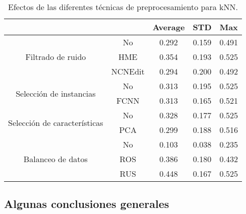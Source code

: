 \begin{table}
    \centering
    \begin{tabular}{cc|c|c|c|}
    \cline{3-5}
    \multicolumn{1}{l}{\textbf{}} & \textbf{} & \multicolumn{1}{c|}{\textbf{Average}} & \multicolumn{1}{c|}{\textbf{STD}} & \textbf{Max} \\ \hline
    \multicolumn{1}{|c|}{\multirow{3}{*}{Filtrado de ruido}}       & No        & 0.292  & 0.159
    & 0.491    \\ \cline{2-5} 
    \multicolumn{1}{|c|}{}  & HME       & 0.354   & 0.193
    & 0.525        \\ \cline{2-5} 
    \multicolumn{1}{|c|}{}  & NCNEdit   & 0.294  & 0.200
    & 0.492        \\ \hline
    \multicolumn{1}{|c|}{\multirow{2}{*}{Selección de instancias}} & No        & 0.313    &  0.195
    & 0.525        \\ \cline{2-5} 
    \multicolumn{1}{|c|}{}  & FCNN      & 0.313   &  0.165
    & 0.521        \\ \hline
    \multicolumn{1}{|c|}{\multirow{2}{*}{Selección de características}} & No        & 0.328    & 0.177
    & 0.525        \\ \cline{2-5} 
    \multicolumn{1}{|c|}{}  & PCA      & 0.299   & 0.188
    & 0.516        \\ \hline
    \multicolumn{1}{|c|}{\multirow{3}{*}{Balanceo de datos}}       & No        & 0.103     &  0.038
    & 0.235        \\ \cline{2-5} 
    \multicolumn{1}{|c|}{}  & ROS       & 0.386  & 0.180
    & 0.432        \\ \cline{2-5} 
    \multicolumn{1}{|c|}{}  & RUS       & 0.448  & 0.167
    & 0.525        \\ \hline
    \end{tabular}
    \caption{Efectos de las diferentes técnicas de preprocesamiento para kNN.}
    \label{knn}
\end{table}

\subsection{Algunas conclusiones generales}

